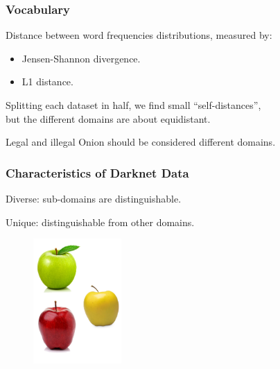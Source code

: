 \documentclass[t,xcolor={svgnames,table}]{beamer}
\begin{document}
\begin{frame}
	\frametitle{Vocabulary}
	Distance between word frequencies distributions, measured by:
	\begin{itemize}
	\item Jensen-Shannon divergence.
	\item L1 distance.
	\end{itemize}
	
	Splitting each dataset in half, we find small ``self-distances'', \\
	but the different domains are about equidistant.
	\vfill
	\pause
	
	\begin{center}
	\end{center}
	\vfill
	\pause
	
	Legal and illegal Onion should be considered different domains.
\end{frame}

\begin{frame}
	\frametitle{Characteristics of Darknet Data}
	
	Diverse: sub-domains are distinguishable.
	\vfill
	
	Unique: distinguishable from other domains.
	
	\begin{figure}
		\centering
		\includegraphics[width=0.3\textwidth]{3different.png}
	\end{figure}
\end{frame}
\end{document}

